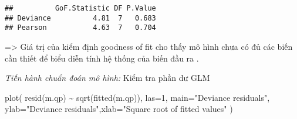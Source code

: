 \documentclass[
]{article}
\newenvironment{Shaded}{\begin{snugshade}}{\end{snugshade}}
\newcommand{\AttributeTok}[1]{\textcolor[rgb]{0.77,0.63,0.00}{#1}}
\newcommand{\ConstantTok}[1]{\textcolor[rgb]{0.00,0.00,0.00}{#1}}
\newcommand{\DecValTok}[1]{\textcolor[rgb]{0.00,0.00,0.81}{#1}}
\newcommand{\FunctionTok}[1]{\textcolor[rgb]{0.00,0.00,0.00}{#1}}
\newcommand{\NormalTok}[1]{#1}
\newcommand{\OtherTok}[1]{\textcolor[rgb]{0.56,0.35,0.01}{#1}}
\newcommand{\SpecialCharTok}[1]{\textcolor[rgb]{0.00,0.00,0.00}{#1}}
\newcommand{\StringTok}[1]{\textcolor[rgb]{0.31,0.60,0.02}{#1}}
\begin{document}
\begin{Shaded}
\end{Shaded}

\begin{verbatim}
##          GoF.Statistic DF P.Value
## Deviance          4.81  7   0.683
## Pearson           4.63  7   0.704
\end{verbatim}

=\textgreater{} Giá trị của kiểm định goodness of fit cho thấy mô hình
chưa có đủ các biến cần thiết để biểu diễn tính hệ thống của biến đầu ra
.

\emph{Tiến hành chuẩn đoán mô hình:} Kiểm tra phần dư GLM

\begin{Shaded}
\begin{Highlighting}[]
\FunctionTok{plot}\NormalTok{( }\FunctionTok{resid}\NormalTok{(m.qp) }\SpecialCharTok{\textasciitilde{}} \FunctionTok{sqrt}\NormalTok{(}\FunctionTok{fitted}\NormalTok{(m.qp)), }\AttributeTok{las=}\DecValTok{1}\NormalTok{, }\AttributeTok{main=}\StringTok{"Deviance residuals"}\NormalTok{, }\AttributeTok{ylab=}\StringTok{"Deviance residuals"}\NormalTok{,}\AttributeTok{xlab=}\StringTok{"Square root of fitted values"}\NormalTok{ )}
\end{Highlighting}
\end{Shaded}
\end{document}
